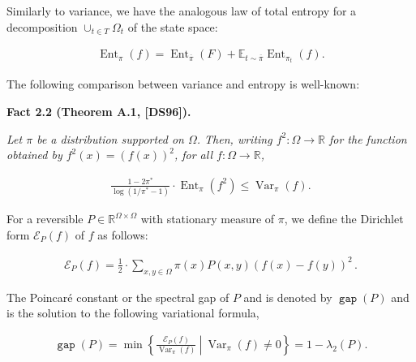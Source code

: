 \documentclass[10pt,a4paper]{article}
\DeclareMathOperator{\Gap}{\mathtt{gap}}\DeclareMathOperator{\MLS}{\mathtt{mls}}\DeclareMathOperator{\EC}{\mathtt{ec}}\DeclareMathOperator{\LS}{\mathtt{ls}}
\begin{document}
Similarly to variance, we have the analogous law of total entropy for a decomposition $\cup_{t\in T}\Omega_{t}$ of the state space:\par


\[\begin{gathered}
\operatorname{Ent}_{\pi}(f)=\operatorname{Ent}_{\overline{\pi}}(F)+\mathbb{E}_{t\sim\overline{\pi}}\operatorname{Ent}_{\pi_{t}}(f).
\end{gathered}\]




The following comparison between variance and entropy is well-known:\par





\par\medskip\noindent\textbf{\textbf{Fact 2.2}\textbf{ }(Theorem A.1, [DS96])\textbf{.}}\par



\emph{Let $\pi$ be a distribution supported on $\Omega$. Then, writing $f^{2}:\Omega\to\mathbb{R}$ for the function obtained by $f^{2}(x)=(f(x))^{2}$, for all $f:\Omega\to\mathbb{R}$,}\par


\[\begin{gathered}
\frac{1-2\pi^{*}}{\log(1/\pi^{*}-1)}\cdot\operatorname{Ent}_{\pi}(f^{2})\leq\operatorname{Var}_{\pi}(f).
\end{gathered}\]






For a reversible $P\in\mathbb{R}^{\Omega\times\Omega}$ with
stationary measure of $\pi$, we define the Dirichlet form $\mathcal{E}_{P}(f)$ of $f$ as follows:\par


\[\begin{gathered}
\mathcal{E}_{P}(f)=\frac{1}{2}\cdot\sum_{x,y\in\Omega}\pi(x)P(x,y)(f(x)-f(y))^{2}\,.
\end{gathered}\]




The Poincaré constant or the spectral gap of $P$ and
is denoted by $\Gap(P)$ and is the solution to the following variational formula,\par


\[\begin{gathered}
\Gap(P)=\min\left\{\left.\frac{\mathcal{E}_{P}(f)}{\operatorname{Var}_{\pi}(f)}~\right|~\operatorname{Var}_{\pi}(f)\neq 0\right\}=1-\lambda_{2}(P).
\end{gathered}\]
\end{document}
